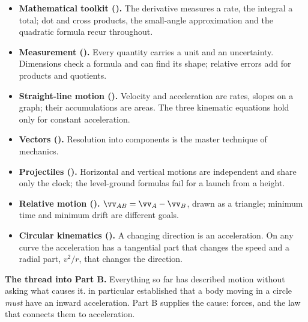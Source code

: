 \begin{itemize}
\item \textbf{Mathematical toolkit ().} The derivative measures a rate, the integral a
      total; dot and cross products, the small-angle approximation and the quadratic formula recur
      throughout.
\item \textbf{Measurement ().} Every quantity carries a unit and an uncertainty. Dimensions check a
      formula and can find its shape; relative errors add for products and quotients.
\item \textbf{Straight-line motion ().} Velocity and acceleration are rates, slopes on a graph; their
      accumulations are areas. The three kinematic equations hold only for constant acceleration.
\item \textbf{Vectors ().} Resolution into components is the master technique of mechanics.
\item \textbf{Projectiles ().} Horizontal and vertical motions are independent and
      share only the clock; the level-ground formulas fail for a launch from a height.
\item \textbf{Relative motion ().} $\vv_{AB}=\vv_A-\vv_B$, drawn as a triangle;
      minimum time and minimum drift are different goals.
\item \textbf{Circular kinematics ().} A changing direction is an acceleration. On any curve the
      acceleration has a tangential part that changes the speed and a radial part, $v^2/r$, that changes the
      direction.
\end{itemize}

\noindent\textbf{The thread into Part B.} Everything so far has described motion without asking what causes
it.  in particular established that a body moving in a circle \emph{must} have an inward
acceleration. Part B supplies the cause: forces, and the law that connects them to acceleration.
